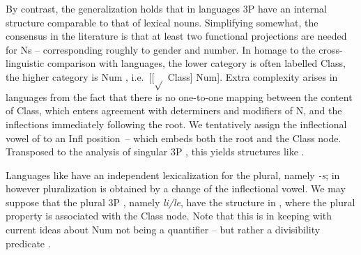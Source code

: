 \documentclass[output=paper]{langsci/langscibook}
\begin{document}
By contrast, the generalization holds that in  languages 3P  have
an internal structure comparable to that of lexical nouns. Simplifying
somewhat, the consensus in the literature is that at least two functional
projections are needed for Ns – corresponding roughly to gender and number. In
homage to the cross-linguistic comparison with  languages, the lower
category is often labelled Class, the higher category is Num
\citep{Picallo2008}, i.e.\ [[${\sqrt{}}$ Class] Num].  Extra complexity arises in
 languages from the fact that there is no one-to-one mapping
between the content of Class, which enters agreement with determiners and
modifiers of N, and the inflections immediately following the root. We
tentatively assign the inflectional vowel of  to an Infl position~–
which embeds both the root and the Class node. Transposed to the analysis of
singular 3P , this yields structures like .

\ea%
    \label{ex:06.4}
\z

Languages like  have an independent lexicalization for the plural,\linebreak
namely \emph{-s}; in  however pluralization is obtained by a change of
the inflectional vowel. We may suppose that the plural 3P , namely
\emph{li/le}, have the structure in , where the plural property
is associated with the Class node. Note that this is in keeping with current
ideas about Num not being a quantifier – but rather a divisibility predicate
\citep{Borer2005}.

\ea%
    \label{ex:06.5}
\z
\end{document}
